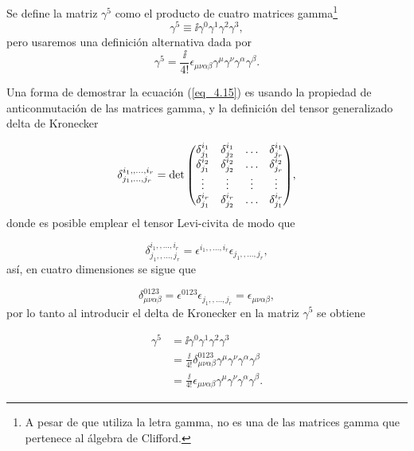 \begin{definition}
	Se define la matriz $\gamma^5$ como el producto de cuatro matrices gamma\footnote{A pesar de que utiliza la letra gamma, no es una de las matrices gamma que pertenece al álgebra de Clifford.}
	\begin{equation}
		\gamma^5 \equiv \ii \gamma^0 \gamma^1 \gamma^2 \gamma^3,
		\label{eq_4.14}
	\end{equation}
	pero usaremos una definición alternativa dada por 
	\begin{equation}
		\boxed{
		\gamma^5 = \frac{\ii}{4!} \epsilon_{\mu \nu \alpha \beta } \gamma^\mu \gamma^\nu \gamma^\alpha \gamma^\beta. }
		\label{eq_4.15}
	\end{equation}
\end{definition}
Una forma de demostrar la ecuación (\ref{eq_4.15}) es usando la propiedad de anticonmutación de las matrices gamma, y la definición del tensor generalizado delta de Kronecker 

\begin{equation}
	\delta^{i_1,,\ldots,i_r}_{j_1,\ldots,j_r} =\det \mqty(  \delta^{i_1}_{j_1} & \delta^{i_1}_{j_2} & \ldots &  \delta^{i_1}_{j_r}  \\
	 \delta^{i_2}_{j_1} & \delta^{i_2}_{j_2} & \ldots & \delta^{i_2}_{j_r} \\
	 \vdots & \vdots & \vdots & \vdots\\
	   \delta^{i_r}_{j_1} & \delta^{i_r}_{j_2} & \ldots &\delta^{i_r}_{j_1} ),
\end{equation}
donde es posible emplear el tensor Levi-civita de modo que 

\begin{equation*}
	\delta^{i_1,,\ldots,i_r}_{j_1,,\ldots,j_r} = \epsilon^{i_1,,\ldots,i_r} \epsilon_{j_1,,\ldots,j_r},
\end{equation*}
así, en cuatro dimensiones se sigue que 

\begin{equation}
	\delta^{0 1 2 3}_{\mu \nu \alpha \beta} = \epsilon^{0123} \epsilon_{j_1,,\ldots,j_r} = \epsilon_{\mu \nu \alpha \beta} ,
\end{equation}
por lo tanto al introducir el delta de Kronecker en la matriz $\gamma^5$ se obtiene

\begin{equation}
	\begin{split}
		\gamma^5 &= \ii \gamma^0 \gamma^1 \gamma^2 \gamma^3\\
		& = \frac{\ii}{4!} \delta^{0 1 2 3}_{\mu \nu \alpha \beta} \gamma^\mu \gamma^\nu \gamma^\alpha \gamma^\beta \\
		&=  \frac{\ii}{4!} \epsilon_{\mu \nu \alpha \beta} \gamma^\mu \gamma^\nu \gamma^\alpha \gamma^\beta.
	\end{split}
\end{equation}

